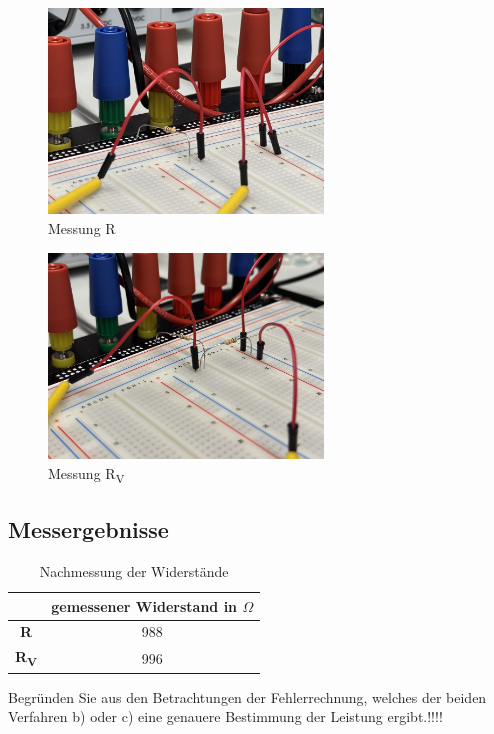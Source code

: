 \documentclass[a4paper,12pt]{article}
\begin{document}
\begin{figure}[H]
    \centering
    \includegraphics[width=0.65\textwidth]{../Quellen/Labor2/Fotos/IMG_3979.jpeg}
\caption{Messung R}
\end{figure}

\begin{figure}[H]
    \centering
    \includegraphics[width=0.65\textwidth]{../Quellen/Labor2/Fotos/IMG_3980.jpeg}
\caption{Messung R\textsubscript{V}}
\end{figure}


\subsection{Messergebnisse}
\begin{table}[H]
	\centering
	\begin{tabular}{|c|c|}
		\hline
		  & gemessener Widerstand in $\Omega$\\
		\hline		
		\textbf{R} & 988\\
		\hline
		\textbf{R\textsubscript{V}} & 996\\
		\hline
	\end{tabular}
	\caption{Nachmessung der Widerstände}
\end{table}
Begründen Sie aus den Betrachtungen der Fehlerrechnung, welches der beiden Verfahren b) oder c) 
eine genauere Bestimmung der Leistung ergibt.!!!!
\end{document}
